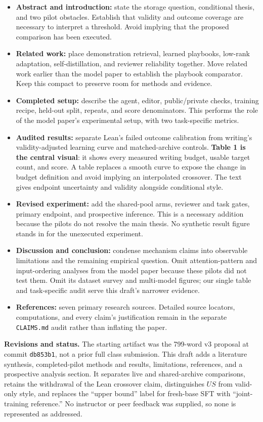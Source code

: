 \documentclass[10pt,letterpaper]{article}
\begin{document}
\begin{itemize}
\item \textbf{Abstract and introduction:} state the storage question, conditional
thesis, and two pilot obstacles. Establish that validity and outcome coverage are
necessary to interpret a threshold. Avoid implying that the proposed comparison
has been executed.
\item \textbf{Related work:} place demonstration retrieval, learned playbooks,
low-rank adaptation, self-distillation, and reviewer reliability together.
Move related work earlier than the model paper to establish the playbook comparator.
Keep this compact to preserve room for methods and evidence.
\item \textbf{Completed setup:} describe the agent, editor, public/private checks,
training recipe, held-out split, repeats, and score denominators. This performs
the role of the model paper's experimental setup, with two task-specific metrics.
\item \textbf{Audited results:} separate Lean's failed outcome calibration from
writing's validity-adjusted learning curve and matched-archive controls.
\textbf{Table 1 is the central visual}: it shows every measured writing budget,
usable target count, and score. A table replaces a smooth curve to expose the
change in budget definition and avoid implying an interpolated crossover.
The text gives endpoint uncertainty and validity alongside conditional style.
\item \textbf{Revised experiment:} add the shared-pool arms, reviewer and task
gates, primary endpoint, and prospective inference. This is a necessary addition
because the pilots do not resolve the main thesis. No synthetic result figure
stands in for the unexecuted experiment.
\item \textbf{Discussion and conclusion:} condense mechanism claims into observable
limitations and the remaining empirical question. Omit attention-pattern and
input-ordering analyses from the model paper because these pilots did not test
them. Omit its dataset survey and multi-model figures; our single table and
task-specific audit serve this draft's narrower evidence.
\item \textbf{References:} seven primary research sources. Detailed source
locators, computations, and every claim's justification remain in the separate
\texttt{CLAIMS.md} audit rather than inflating the paper.
\end{itemize}

\textbf{Revisions and status.}
The starting artifact was the 799-word v3 proposal at commit
\texttt{db853b1}, not a prior full class submission.
This draft adds a literature synthesis, completed-pilot methods and results,
limitations, references, and a prospective analysis section.
It separates live and shared-archive comparisons, retains the withdrawal of the Lean
crossover claim, distinguishes $U S$ from valid-only style, and replaces the
``upper bound'' label for fresh-base SFT with ``joint-training reference.''
No instructor or peer feedback was supplied, so none is represented as addressed.
\end{document}
